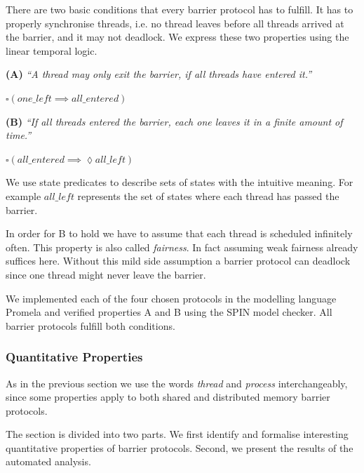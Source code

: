 \documentclass[a4paper, 10pt]{article}
\begin{document}
There are two basic conditions that every barrier protocol has to fulfill.
It has to properly synchronise threads, i.e. no thread leaves before all threads arrived at the barrier, and it may not deadlock.
We express these two properties using the linear temporal logic.

\vspace{0.2cm}
\noindent \textbf{(A)} \emph{``A thread may only exit the barrier, if all threads have entered it.''}
\begin{center}
	$\square ( \mathit{one\_left} \implies \mathit{all\_entered} )$
\end{center}

\vspace{0.2cm}
\noindent \textbf{(B)} \emph{``If all threads entered the barrier, each one leaves it in a finite amount of time.''}
\begin{center}
	$\square ( \mathit{all\_entered} \implies \lozenge \mathit{all\_left} )$
\end{center}

We use state predicates to describe sets of states with the intuitive meaning. For example $\mathit{all\_left}$ represents the set of states where each thread has passed the barrier.

In order for B to hold we have to assume that each thread is scheduled infinitely often. This property is also called \emph{fairness}. In fact assuming weak fairness already suffices here. Without this mild side assumption a barrier protocol can deadlock since one thread might never leave the barrier.

We implemented each of the four chosen protocols in the modelling language Promela and verified properties A and B using the SPIN model checker.
All barrier protocols fulfill both conditions.

\subsubsection{Quantitative Properties}
\label{sssec:analysis-modelchecking-quantitative-properties}
As in the previous section we use the words \emph{thread} and \emph{process} interchangeably, since some properties apply to both shared and distributed memory barrier protocols.

The section is divided into two parts. We first identify and formalise interesting quantitative properties of barrier protocols. Second, we present the results of the automated analysis.
\end{document}
